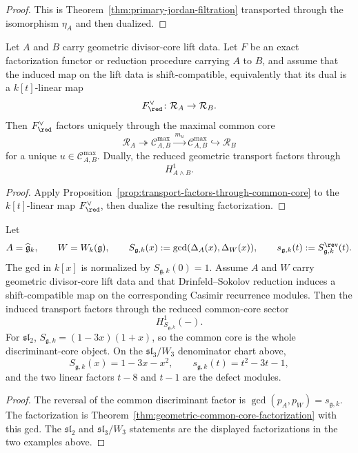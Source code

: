 \begin{proof}
This is Theorem~\ref{thm:primary-jordan-filtration} transported through
the isomorphism \(\eta_A\) and then dualized.
\end{proof}

\begin{theorem}
\label{thm:geometric-common-core-factorization}
Let \(A\) and \(B\) carry geometric divisor-core lift data.
Let \(F\) be an exact factorization functor or reduction procedure carrying
\(A\) to \(B\), and assume that the induced map on the lift data is
shift-compatible, equivalently that its dual is a \(k[t]\)-linear map
\[
F^\vee_{\red}\colon \mathcal R_A\to \mathcal R_B.
\]
Then \(F^\vee_{\red}\) factors uniquely through the maximal common core
\[
\mathcal R_A\twoheadrightarrow \mathcal C^{\max}_{A,B}
\xrightarrow{\,m_u\,}\mathcal C^{\max}_{A,B}\hookrightarrow \mathcal R_B
\]
for a unique \(u\in \mathcal C^{\max}_{A,B}\).
Dually, the reduced geometric transport factors through
\[
H^{1}_{A\wedge B}.
\]
\end{theorem}

\begin{proof}
Apply Proposition~\ref{prop:transport-factors-through-common-core} to
the \(k[t]\)-linear map \(F^\vee_{\red}\), then dualize the resulting
factorization.
\end{proof}

\begin{theorem}
\label{thm:geometric-ds-common-core}
Let
\[
A=\widehat{\mathfrak g}_k,
\qquad
W=W_k(\mathfrak g),
\qquad
S_{\mathfrak g,k}(x):=\gcd(\Delta_A(x),\Delta_W(x)),
\qquad
s_{\mathfrak g,k}(t):=S_{\mathfrak g,k}^{\rev}(t).
\]
The gcd in \(k[x]\) is normalized by \(S_{\mathfrak g,k}(0)=1\).
Assume \(A\) and \(W\) carry geometric divisor-core lift data and that
Drinfeld--Sokolov reduction induces a shift-compatible map on the corresponding
Casimir recurrence modules.
Then the induced transport factors through the reduced common-core sector
\[
H^1_{S_{\mathfrak g,k}}(-).
\]
For \(\mathfrak{sl}_2\), \(S_{\mathfrak g,k}=(1-3x)(1+x)\), so the common
core is the whole discriminant-core object.
On the \(\mathfrak{sl}_3/W_3\) denominator chart above,
\[
S_{\mathfrak g,k}(x)=1-3x-x^2,\qquad
s_{\mathfrak g,k}(t)=t^2-3t-1,
\]
and the two linear factors \(t-8\) and \(t-1\) are the defect modules.
\end{theorem}

\begin{proof}
The reversal of the common discriminant factor is
\(\gcd(p_A,p_W)=s_{\mathfrak g,k}\).
The factorization is Theorem~\ref{thm:geometric-common-core-factorization}
with this gcd.
The \(\mathfrak{sl}_2\) and \(\mathfrak{sl}_3/W_3\) statements are the
displayed factorizations in the two examples above.
\end{proof}

